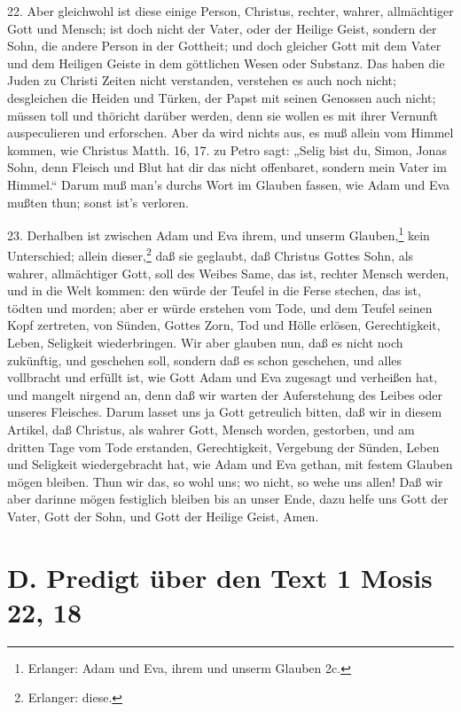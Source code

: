 22. Aber gleichwohl ist diese einige Person, Christus, rechter, wahrer, allmächtiger Gott und Mensch; ist doch nicht der Vater, oder der Heilige Geist, sondern der Sohn, die andere Person in der Gottheit; und doch gleicher Gott mit dem Vater und dem Heiligen Geiste in dem göttlichen Wesen oder Substanz. Das haben die Juden zu Christi Zeiten nicht verstanden, verstehen es auch noch nicht; desgleichen die Heiden und Türken, der Papst mit seinen Genossen auch nicht; müssen toll und thöricht darüber werden, denn sie wollen es mit ihrer Vernunft auspeculieren und erforschen. Aber da wird nichts aus, es muß allein vom Himmel kommen, wie Christus Matth. 16, 17. zu Petro sagt: „Selig bist du, Simon, Jonas Sohn, denn Fleisch und Blut hat dir das nicht offenbaret, sondern mein Vater im Himmel.“ Darum muß man’s durchs Wort im Glauben fassen, wie Adam und Eva mußten thun; sonst ist’s verloren.

23. Derhalben ist zwischen Adam und Eva ihrem, und unserm Glauben,\footnote{Erlanger: Adam und Eva, ihrem und unserm Glauben 2c.} kein Unterschied; allein dieser,\footnote{Erlanger: diese.} daß sie geglaubt, daß Christus Gottes Sohn, als wahrer, allmächtiger Gott, soll des Weibes Same, das ist, rechter Mensch werden, und in die Welt kommen: den würde der Teufel in die Ferse stechen, das ist, tödten und morden; aber er würde erstehen vom Tode, und dem Teufel seinen Kopf zertreten, von Sünden, Gottes Zorn, Tod und Hölle erlösen, Gerechtigkeit, Leben, Seligkeit wiederbringen. Wir aber glauben nun, daß es nicht noch zukünftig, und geschehen soll, sondern daß es schon geschehen, und alles vollbracht und erfüllt ist, wie Gott Adam und Eva zugesagt und verheißen hat, und mangelt nirgend an, denn daß wir warten der Auferstehung des Leibes oder unseres Fleisches. Darum lasset uns ja Gott getreulich bitten, daß wir in diesem Artikel, daß Christus, als wahrer Gott, Mensch worden, gestorben, und am dritten Tage vom Tode erstanden, Gerechtigkeit, Vergebung der Sünden, Leben und Seligkeit wiedergebracht hat, wie Adam und Eva gethan, mit festem Glauben mögen bleiben. Thun wir das, so wohl uns; wo nicht, so wehe uns allen! Daß wir aber darinne mögen festiglich bleiben bis an unser Ende, dazu helfe uns Gott der Vater, Gott der Sohn, und Gott der Heilige Geist, Amen.

\chapter{D. Predigt über den Text 1 Mosis 22, 18}

